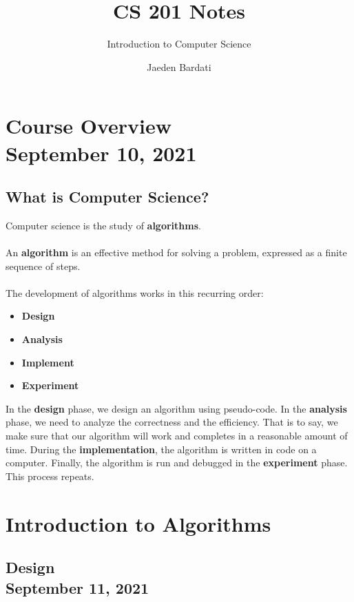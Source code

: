 \documentclass[]{article}
\title{CS 201 Notes}
\subtitle{Introduction to Computer Science}
\author{Jaeden Bardati}
\begin{document}
\maketitle
\bigbreak

\section{Course Overview\\ {\large \normalfont September 10, 2021}}
\bigbreak

\subsection{What is Computer Science?}
\bigbreak

Computer science is the study of \textbf{algorithms}.\\\\
An \textbf{algorithm} is an effective method for solving a problem, expressed as a finite sequence of steps.\\\\
The development of algorithms works in this recurring order:
\begin{itemize}
	\item \textbf{Design}
	\item \textbf{Analysis}
	\item \textbf{Implement}
	\item \textbf{Experiment}\smallskip
\end{itemize}

\noindent In the \textbf{design} phase, we design an algorithm using pseudo-code. In the \textbf{analysis} phase, we need to analyze the correctness and the efficiency. That is to say, we make sure that our algorithm will work and completes in a reasonable amount of time. During the \textbf{implementation}, the algorithm is written in code on a computer. Finally, the algorithm is run and debugged in the \textbf{experiment} phase. This process repeats.


\section{Introduction to Algorithms}
\bigbreak

\subsection{Design\\ {\normalfont September 11, 2021}}
\bigbreak
\end{document}
